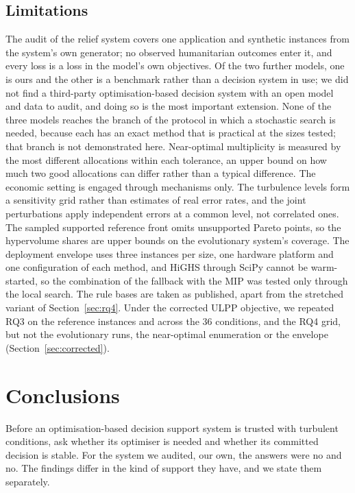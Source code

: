 \documentclass[systems,article,accept,moreauthors,pdftex]{Definitions/mdpi}
\begin{document}
\subsection{Limitations}
The audit of the relief system covers one application and synthetic instances from the system's
own generator; no observed humanitarian outcomes enter it, and every loss is a loss in the model's
own objectives. Of the two further models, one is ours and the other is a benchmark rather than a
decision system in use; we did not find a third-party optimisation-based decision system with an
open model and data to audit, and doing so is the most important extension. None of the three
models reaches the branch of the protocol in which a stochastic search is needed, because each
has an exact method that is practical at the sizes tested; that branch is not demonstrated
here. Near-optimal multiplicity is measured by the most different allocations within each
tolerance, an upper bound on how much two good allocations can differ rather than a typical
difference. The economic setting
is engaged through mechanisms only. The turbulence levels form a sensitivity grid rather than
estimates of real error rates, and the joint perturbations apply independent errors at a common
level, not correlated ones. The sampled supported reference front omits unsupported Pareto points,
so the hypervolume shares are upper bounds on the evolutionary system's coverage. The deployment
envelope uses three instances per size, one hardware platform and one configuration of each
method, and HiGHS through SciPy cannot be warm-started, so the combination of the fallback with
the MIP was tested only through the local search. The rule bases are taken as published, apart
from the stretched variant of Section~\ref{sec:rq4}. Under the corrected ULPP objective, we
repeated RQ3 on the reference instances and across the $36$ conditions, and the RQ4 grid, but
not the evolutionary runs, the near-optimal enumeration or the envelope
(Section~\ref{sec:corrected}).

\section{Conclusions}\label{sec:conclusion}
Before an optimisation-based decision support system is trusted with turbulent conditions, ask
whether its optimiser is needed and whether its committed decision is stable. For the system we
audited, our own, the answers were no and no. The findings differ in the kind of support they
have, and we state them separately.
\end{document}
